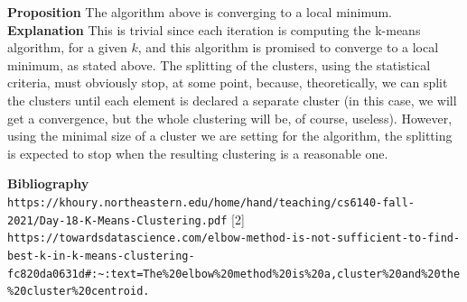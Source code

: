 \documentclass[12pt]{article}
\begin{document}
\textbf{Proposition} The algorithm above is converging to a local minimum.\newline
\textbf{Explanation} This is trivial since each iteration is computing the k-means algorithm, for a given $k$, and this algorithm is promised to converge to a local minimum, as stated above. \newline
The splitting of the clusters, using the statistical criteria, must obviously stop, at some point, because, theoretically, we can split the clusters until each element is declared a separate cluster (in this case, we will get a convergence, but the whole clustering will be, of course, useless). However, using the minimal size of a cluster we are setting for the algorithm, the splitting is expected to stop when the resulting clustering is a reasonable one. \newline

\textbf{Bibliography}
\newpage
[1] \verb|https://khoury.northeastern.edu/home/hand/teaching/cs6140-fall-2021/Day-18-K-Means-Clustering.pdf|
[2] \verb|https://towardsdatascience.com/elbow-method-is-not-sufficient-to-find-best-k-in-k-means-clustering-fc820da0631d#:~:text=The%20elbow%20method%20is%20a,cluster%20and%20the%20cluster%20centroid.|
\end{document}
